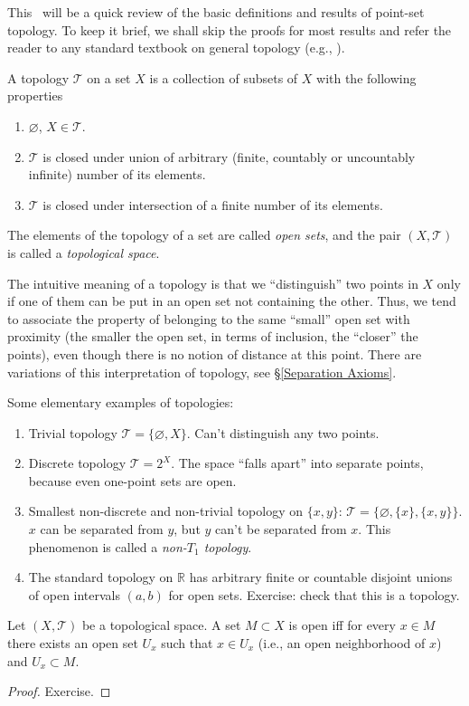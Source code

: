 This \sect\ will be a quick review of the basic definitions and results of point-set topology. To keep it brief, we shall skip the proofs for most results and refer the reader to any standard textbook on general topology (e.g., \cite{Munk}).

\begin{defn}[Topology]
    A topology $\mathcal{{T}}$ on a set $X$ is a collection of subsets
    of $X$ with the following properties
    \begin{enumerate}
    \item $\varnothing$, $X\in\mathcal{{T}}$.
    \item $\mathcal{{T}}$ is closed under union of arbitrary (finite, countably
    or uncountably infinite) number of its elements.
    \item $\mathcal{{T}}$ is closed under intersection of a finite number of
    its elements.
    \end{enumerate}
    The elements of the topology of a set are called \emph{open sets},
    and the pair $(X,\mathcal{{T}})$ is called a \emph{topological
    space}.
\end{defn}

The intuitive meaning of a topology is that we ``distinguish'' two points in $X$ only if one of them can be put in an open set not containing the other. Thus, we tend to associate the property of belonging to the same ``small'' open set with proximity (the smaller the open set, in terms of inclusion, the ``closer'' the points), even though there is no notion of distance at this point. There are variations of this interpretation of topology, see \S\ref{Separation Axioms}.

\begin{example} Some elementary examples of topologies:
\begin{enumerate}
    \item Trivial topology $\mathcal T=\{\varnothing,X\}$. Can't distinguish any two points.
    \item Discrete topology $\mathcal T=2^X$. The space ``falls apart'' into separate points, because even one-point sets are open.
    \item Smallest non-discrete and non-trivial topology on $\{x,y\}$: $\mathcal{T}=\{\varnothing,\{x\},\{x,y\}\}$. $x$ can be separated from $y$, but $y$ can't be separated from $x$. This phenomenon is called a \emph{non-$T_1$ topology}.
    \item The standard topology on $\mathbb R$ has arbitrary finite or countable disjoint unions of open intervals $(a,b)$ for open sets. Exercise: check that this is a topology.
\end{enumerate}
\end{example}
\begin{prop}\label{open iff contains neighborhoods}
    Let $(X,\mathcal{T})$ be a topological space. A set $M\subset X$ is open iff for every $x\in M$ there exists an open set $U_x$ such that $x\in U_x$ (i.e., an open neighborhood of $x$) and $U_x\subset M$.
\end{prop}
\begin{proof}
    Exercise.
\end{proof}

